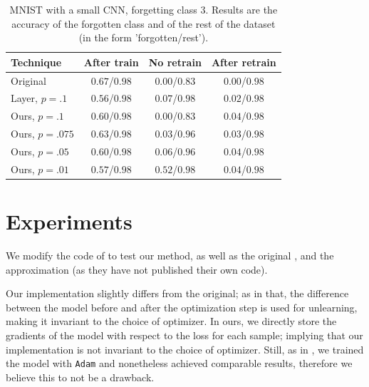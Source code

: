 \documentclass{article}
\begin{document}
\begin{table}
    \centering
    \caption{MNIST with a small CNN, forgetting class $3$. Results are the accuracy of the forgotten class and of the rest of the dataset (in the form 'forgotten/rest').}
    \label{tab:mnist_small_cnn}
    \begin{tabular}{l | c | c c}
        Technique&After train&No retrain&After retrain\\
        \hline
        Original&$0.67$/$0.98$& $0.00$/$0.83$& $0.00$/$0.98$\\
        Layer, $p=.1$&$0.56$/$0.98$& $0.07$/$0.98$& $0.02$/$0.98$\\
        \hline
        Ours, $p=.1$&$0.60$/$0.98$& $0.00$/$0.83$& $0.04$/$0.98$\\
        Ours, $p=.075$&$0.63$/$0.98$&$0.03$/$0.96$& $0.03$/$0.98$\\
        Ours, $p=.05$&$0.60$/$0.98$&$0.06$/$0.96$&$0.04$/$0.98$\\
        Ours, $p=.01$&$0.57$/$0.98$&$0.52$/$0.98$&$0.04$/$0.98$\\
    \end{tabular}
\end{table}

\section{Experiments} We modify the code of \cite{graves2021amnesiac} to test our method, as well as the original \cite{graves2021amnesiac}, and the approximation \cite{gogineni2024efficient} (as they have not published their own code).

Our implementation slightly differs from the original; as in that, the difference between the model before and after the optimization step is used for unlearning, making it invariant to the choice of optimizer. In ours, we directly store the gradients of the model with respect to the loss for each sample; implying that our implementation is not invariant to the choice of optimizer. Still, as in \cite{graves2021amnesiac}, we trained the model with \texttt{Adam} and nonetheless achieved comparable results, therefore we believe this to not be a drawback.
\end{document}

